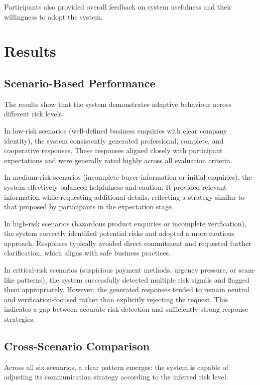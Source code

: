 \documentclass[12pt,a4paper]{report}
\begin{document}
Participants also provided overall feedback on system usefulness and their willingness to adopt the system.

\section{Results}

\subsection{Scenario-Based Performance}

The results show that the system demonstrates adaptive behaviour across different risk levels.

In low-risk scenarios (well-defined business enquiries with clear company identity), the system consistently generated professional, complete, and cooperative responses. These responses aligned closely with participant expectations and were generally rated highly across all evaluation criteria.

In medium-risk scenarios (incomplete buyer information or initial enquiries), the system effectively balanced helpfulness and caution. It provided relevant information while requesting additional details, reflecting a strategy similar to that proposed by participants in the expectation stage.

In high-risk scenarios (hazardous product enquiries or incomplete verification), the system correctly identified potential risks and adopted a more cautious approach. Responses typically avoided direct commitment and requested further clarification, which aligns with safe business practices.

In critical-risk scenarios (suspicious payment methods, urgency pressure, or scam-like patterns), the system successfully detected multiple risk signals and flagged them appropriately. However, the generated responses tended to remain neutral and verification-focused rather than explicitly rejecting the request. This indicates a gap between accurate risk detection and sufficiently strong response strategies.

\subsection{Cross-Scenario Comparison}

Across all six scenarios, a clear pattern emerges: the system is capable of adjusting its communication strategy according to the inferred risk level.
\end{document}

